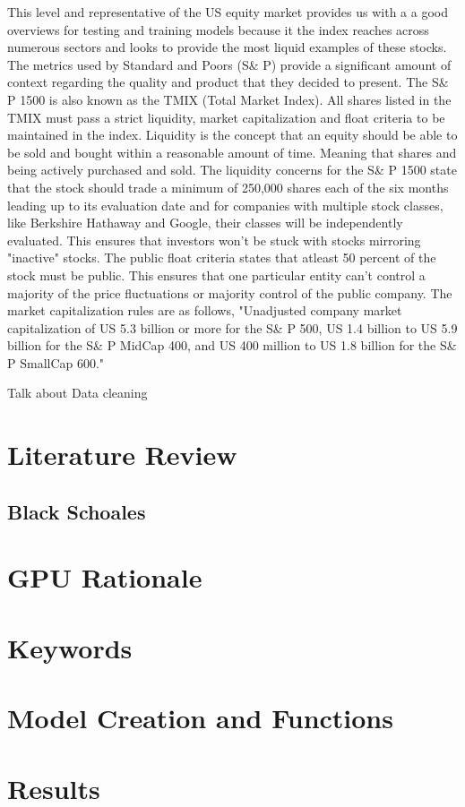 \documentclass[paper=letter, fontsize=11pt]{scrartcl}
\numberwithin{equation}{section}		%
\numberwithin{figure}{section}			%
\numberwithin{table}{section}				%
\begin{document}
\begin{spacing}{2}
This level and representative of the US equity market provides us with a a good overviews for testing and training models because it the index reaches across numerous sectors and looks to provide the most liquid examples of these stocks. The metrics used by Standard and Poors (S\& P) provide a significant amount of context regarding the quality and product that they decided to present. The S\& P 1500 is also known as the TMIX (Total Market Index). All shares listed in the TMIX must pass a strict liquidity, market capitalization and float criteria to be maintained in the index. Liquidity is the concept that an equity should be able to be sold and bought within a reasonable amount of time. Meaning that shares and being actively purchased and sold. The liquidity concerns for the S\& P 1500 state that the stock should trade a minimum of 250,000 shares each of the six months leading up to its evaluation date and for companies with multiple stock classes, like Berkshire Hathaway and Google, their classes will be independently evaluated. This ensures that investors won't be stuck with stocks mirroring "inactive" stocks. The public float criteria states that atleast 50 percent of the stock must be public. This ensures that one particular entity can't control a majority of the price fluctuations or majority control of the public company. The market capitalization rules are as follows, "Unadjusted company market capitalization of US 5.3 billion or more for the S\& P 500, US 1.4 billion to US 5.9 billion for the  S\& P MidCap 400, and US 400 million to US 1.8 billion for the S\& P SmallCap 600." \cite{Methodology}

Talk about Data cleaning

\section{Literature Review}
\subsection{Black Schoales}
\section{GPU Rationale}
\section{Keywords}
\section{Model Creation and Functions}
\section{Results}





\end{spacing}

 
\end{document}
